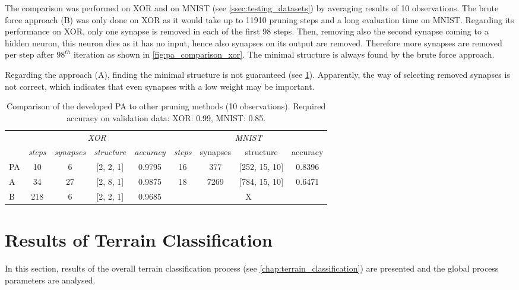 The comparison was performed on XOR and on MNIST (see \cref{ssec:testing_datasets}) by averaging results of 10 observations. The brute force approach (B) was only done on XOR as it would take up to 11910 pruning steps and a long evaluation time on MNIST. Regarding its performance on XOR, only one synapse is removed in each of the first $ 98 $ steps. Then, removing also the second synapse coming to a hidden neuron, this neuron dies as it has no input, hence also synapses on its output are removed. Therefore more synapses are removed per step after $ 98^{th} $ iteration as shown in \cref{fig:pa_comparison_xor}. The minimal structure is always found by the brute force approach.

Regarding the approach (A), finding the minimal structure is not guaranteed (see \cref{tab:pa_comparison}). Apparently, the way of selecting removed synapses is not correct, which indicates that even synapses with a low weight may be important. 

\begin{table}[H]
\centering
\caption{Comparison of the developed PA to other pruning methods (10 observations). Required accuracy on validation data: XOR: 0.99, MNIST: 0.85.}
\label{tab:pa_comparison}
\resizebox{\textwidth}{!} {
\begin{tabular}{|l|c|c|c|c|c|c|c|c|}
\hline
\multirow{2}{*}{} & \multicolumn{4}{c|}{\textit{XOR}}                                           & \multicolumn{4}{c|}{\textit{MNIST}}                      \\ \cline{2-9} 
                  & \textit{steps} & \textit{synapses} & \textit{structure} & \textit{accuracy} & \textit{steps} & synapses & structure         & accuracy \\ \hline
PA                & 10             & 6                 & {[}2, 2, 1{]}      & 0.9795            & 16             & 377      & {[}252, 15, 10{]} & 0.8396   \\ \hline
A                 & 34             & 27                & {[}2, 8, 1{]}      & 0.9875            & 18             & 7269     & {[}784, 15, 10{]} & 0.6471   \\ \hline
B                 & 218            & 6                 & {[}2, 2, 1{]}      & 0.9685            & \multicolumn{4}{c|}{X}                                   \\ \hline
\end{tabular}}
\end{table}

\section{Results of Terrain Classification} \label{sec:terrain_processing_results}
In this section, results of the overall terrain classification process (see \cref{chap:terrain_classification}) are presented and the global process parameters are analysed.  

